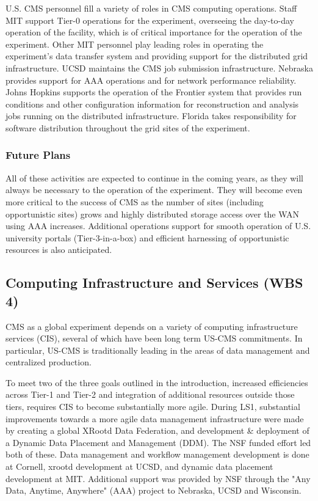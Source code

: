 \documentclass[11pt,a4paper]{article}
\begin{document}
U.S. CMS personnel fill a variety of roles in CMS computing operations.
Staff MIT support Tier-0 operations for the experiment, overseeing the
day-to-day operation of the facility, which is of critical importance for
the operation of the experiment.  Other MIT personnel play leading roles in
operating the experiment's data transfer system and providing support for
the distributed grid infrastructure.  UCSD maintains the CMS job submission
infrastructure.  Nebraska provides support for AAA operations and for
network performance reliability.  Johns Hopkins supports the operation of
the Frontier system that provides run conditions and other configuration
information for reconstruction and analysis jobs running on the distributed
infrastructure.  Florida takes responsibility for software distribution
throughout the grid sites of the experiment.

\subsubsection{Future Plans}

All of these activities are expected to continue in the coming years, as
they will always be necessary to the operation of the experiment.  They
will become even more critical to the success of CMS as the number of sites
(including opportunistic sites) grows and highly distributed storage access
over the WAN using AAA increases.  Additional operations support for smooth
operation of U.S. university portals (Tier-3-in-a-box) and efficient
harnessing of opportunistic resources is also anticipated.

\subsection{Computing Infrastructure and Services (WBS 4)}

CMS as a global experiment depends on a variety of computing infrastructure services (CIS), several of which
have been long term US-CMS commitments. In particular, US-CMS is traditionally leading in the areas
of data management and centralized production. 

To meet two of the three goals outlined in the introduction, increased efficiencies across Tier-1 and Tier-2
and integration of additional resources outside those tiers, requires CIS to become substantially more agile.
During LS1, substantial improvements towards a more agile data management infrastructure 
were made by creating a global XRootd Data Federation, and 
development \& deployment of a Dynamic Data Placement and Management (DDM). 
The NSF funded effort led both of these. Data management and workflow 
management development is done at Cornell, xrootd development at
UCSD, and dynamic data placement development at MIT.  Additional 
support was provided by NSF through the "Any Data, Anytime, Anywhere" (AAA) project to Nebraska, UCSD
and Wisconsin.
\end{document}
